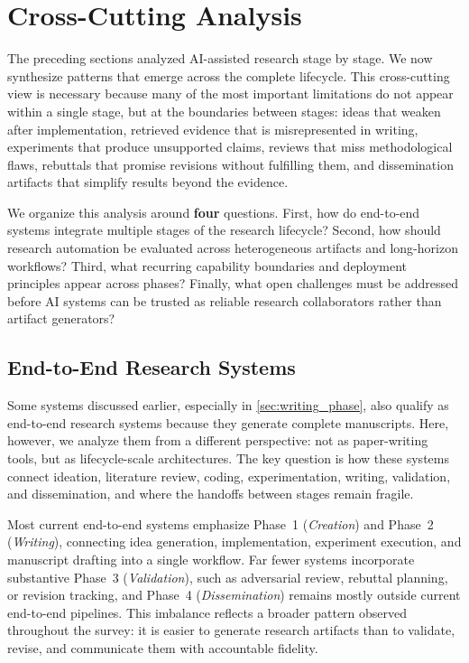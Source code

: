 \section{Cross-Cutting Analysis}
\label{sec:cross_cutting}

The preceding sections analyzed AI-assisted research stage by stage. We now synthesize patterns that emerge across the complete lifecycle. This cross-cutting view is necessary because many of the most important limitations do not appear within a single stage, but at the boundaries between stages: ideas that weaken after implementation, retrieved evidence that is misrepresented in writing, experiments that produce unsupported claims, reviews that miss methodological flaws, rebuttals that promise revisions without fulfilling them, and dissemination artifacts that simplify results beyond the evidence.

We organize this analysis around \textbf{four} questions. First, how do end-to-end systems integrate multiple stages of the research lifecycle? Second, how should research automation be evaluated across heterogeneous artifacts and long-horizon workflows? Third, what recurring capability boundaries and deployment principles appear across phases? Finally, what open challenges must be addressed before AI systems can be trusted as reliable research collaborators rather than artifact generators?



\subsection{End-to-End Research Systems}
\label{sec:e2e_systems}

Some systems discussed earlier, especially in \cref{sec:writing_phase}, also qualify as end-to-end research systems because they generate complete manuscripts. Here, however, we analyze them from a different perspective: not as paper-writing tools, but as lifecycle-scale architectures. The key question is how these systems connect ideation, literature review, coding, experimentation, writing, validation, and dissemination, and where the handoffs between stages remain fragile.

Most current end-to-end systems emphasize Phase~1 (\emph{Creation}) and Phase~2 (\emph{Writing}), connecting idea generation, implementation, experiment execution, and manuscript drafting into a single workflow. Far fewer systems incorporate substantive Phase~3 (\emph{Validation}), such as adversarial review, rebuttal planning, or revision tracking, and Phase~4 (\emph{Dissemination}) remains mostly outside current end-to-end pipelines. This imbalance reflects a broader pattern observed throughout the survey: it is easier to generate research artifacts than to validate, revise, and communicate them with accountable fidelity. 

